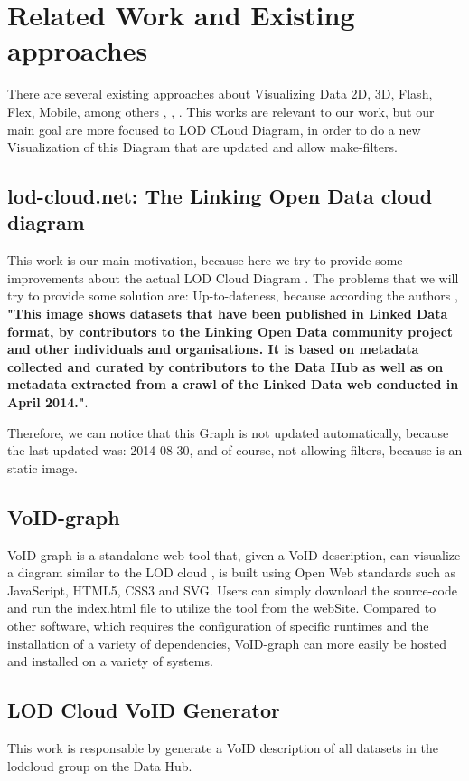 \documentclass{iosart2c}
\begin{document}
\section{Related Work and Existing approaches} %
\label{sec:related}

There are several existing approaches about Visualizing Data 2D, 3D, Flash, Flex, Mobile, among others \cite{SeveralSurveys}, \cite{Dadzie2011}, \cite{IJST38378}. This works are relevant to our work, but our main goal are more focused to LOD CLoud Diagram, in order to do a new Visualization of this Diagram that are updated and allow make-filters.

\subsection{lod-cloud.net: The Linking Open Data cloud diagram}
This work is our main motivation, because here we try to provide some improvements about the actual LOD Cloud Diagram \cite{lodcloud}.
The problems that we will try to provide some solution are: Up-to-dateness, because according the authors \cite{lodcloud}, \textbf{"This image shows datasets that have been published in Linked Data format, by contributors to the Linking Open Data community project and other individuals and organisations. It is based on metadata collected and curated by contributors to the Data Hub as well as on metadata extracted from a crawl of the Linked Data web conducted in April 2014."}.

Therefore, we can notice that this Graph is not updated automatically, because the last updated was: 2014-08-30, and of course, not allowing filters, because is an static image.


\subsection{VoID-graph}
VoID-graph \cite{Voidgraph} is a standalone web-tool that, given a VoID description, can visualize a diagram similar to the LOD cloud \cite{lodcloud}, is built using Open Web standards such as JavaScript, HTML5, CSS3 and SVG. Users can simply download the source-code and run the index.html file to utilize the tool from the webSite. Compared to other software, which requires the configuration of specific runtimes and the installation of a variety of dependencies, VoID-graph can more easily be hosted and installed on a variety of systems.

\subsection{LOD Cloud VoID Generator}
This work \cite{VoIdGenerator} is responsable by generate a VoID description of all datasets in the lodcloud group on the Data Hub.
\end{document}
